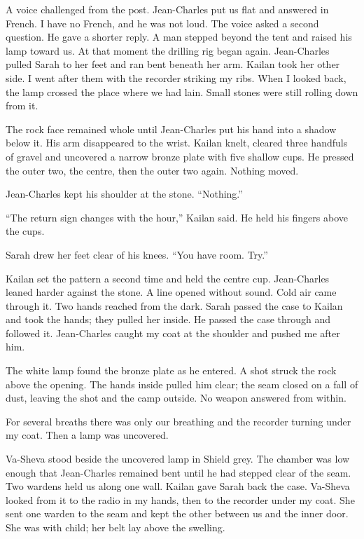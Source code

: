 A voice challenged from the post. Jean-Charles put us flat and answered in French. I have no French, and he was not loud. The voice asked a second question. He gave a shorter reply. A man stepped beyond the tent and raised his lamp toward us. At that moment the drilling rig began again. Jean-Charles pulled Sarah to her feet and ran bent beneath her arm. Kailan took her other side. I went after them with the recorder striking my ribs. When I looked back, the lamp crossed the place where we had lain. Small stones were still rolling down from it.\par

The rock face remained whole until Jean-Charles put his hand into a shadow below it. His arm disappeared to the wrist. Kailan knelt, cleared three handfuls of gravel and uncovered a narrow bronze plate with five shallow cups. He pressed the outer two, the centre, then the outer two again. Nothing moved.\par

Jean-Charles kept his shoulder at the stone. ``Nothing.''\par

``The return sign changes with the hour,'' Kailan said. He held his fingers above the cups.\par

Sarah drew her feet clear of his knees. ``You have room. Try.''\par

Kailan set the pattern a second time and held the centre cup. Jean-Charles leaned harder against the stone. A line opened without sound. Cold air came through it. Two hands reached from the dark. Sarah passed the case to Kailan and took the hands; they pulled her inside. He passed the case through and followed it. Jean-Charles caught my coat at the shoulder and pushed me after him.\par

The white lamp found the bronze plate as he entered. A shot struck the rock above the opening. The hands inside pulled him clear; the seam closed on a fall of dust, leaving the shot and the camp outside. No weapon answered from within.\par

For several breaths there was only our breathing and the recorder turning under my coat. Then a lamp was uncovered.\par

\ornament

Va-Sheva stood beside the uncovered lamp in Shield grey. The chamber was low enough that Jean-Charles remained bent until he had stepped clear of the seam. Two wardens held us along one wall. Kailan gave Sarah back the case. Va-Sheva looked from it to the radio in my hands, then to the recorder under my coat. She sent one warden to the seam and kept the other between us and the inner door. She was with child; her belt lay above the swelling.\par

